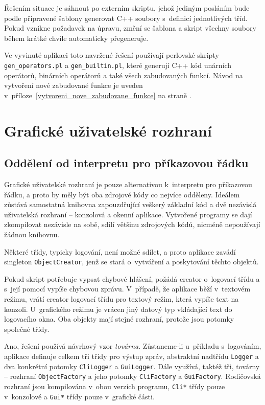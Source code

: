 \documentclass[11pt,twoside,a4paper]{book}
\begin{document}
Řešením situace je sáhnout po externím skriptu, jehož jediným posláním bude podle při\-pra\-ve\-né šablony generovat C++ soubory s~definicí jednotlivých tříd. Pokud vznikne požadavek na úpravu, změní se šablona a skript všechny soubory během krátké chvíle automaticky přegeneruje.

Ve vyvinuté aplikaci toto navržené řešení používají perlovské skripty \texttt{gen\_\-ope\-ra\-tors.pl} a \texttt{gen\_builtin.pl}, které generují C++ kód unárních operátorů, binárních operátorů a také všech zabudovaných funkcí. Návod na vytvoření nové zabudované funkce je uveden v~příloze~\ref{vytvoreni_nove_zabudovane_funkce} na straně \pageref{vytvoreni_nove_zabudovane_funkce}.


\clearpage
\section{Grafické uživatelské rozhraní}

\subsection{Oddělení od interpretu pro příkazovou řádku}
\label{oddeleni_od_interpretu_pro_prikazovou_radku}

Grafické uživatelské rozhraní je pouze alternativou k~interpretu pro příkazovou řádku, a proto by měly být oba zdrojové kódy co nejvíce odděleny. Ideálem zůstává samostatná knihovna zapouzdřující veškerý základní kód a dvě nezávislá uživatelská rozhraní -- konzolová a okenní aplikace. Vytvořené programy se dají zkompilovat nezávisle na sobě, sdílí většinu zdrojových kódů, nicméně nepoužívají žádnou knihovnu.

Některé třídy, typicky logování, není možné sdílet, a proto aplikace zavádí singleton \texttt{Ob\-ject\-Cre\-a\-tor}, jenž se stará o~vytváření a poskytování těchto objektů.

Pokud skript potřebuje vypsat chybové hlášení, požádá creator o~logovací třídu a s~její pomocí vypíše chybovou zprávu. V~případě, že aplikace běží v~textovém režimu, vrátí creator logovací třídu pro textový režim, která vypíše text na konzoli. U~grafického režimu je vrácen jiný datový typ vkládající text do logovacího okna. Oba objekty mají stejné rozhraní, protože jsou potomky společné třídy.

Ano, řešení používá návrhový vzor \textit{továrna}. Zůstaneme-li u~příkladu s~logováním, aplikace definuje celkem tři třídy pro výstup zpráv, abstraktní nadtřídu \texttt{Logger} a dva konkrétní potomky \texttt{CliLogger} a \texttt{GuiLogger}. Dále využívá, taktéž tři, továrny -- rozhraní \texttt{ObjectFactory} a jeho potomky \texttt{CliFactory} a \texttt{GuiFactory}. Rodičovská rozhraní jsou kompilována v~obou verzích programu, \texttt{Cli*} třídy pouze v~konzolové a \texttt{Gui*} třídy pouze v~grafické části.
\end{document}
